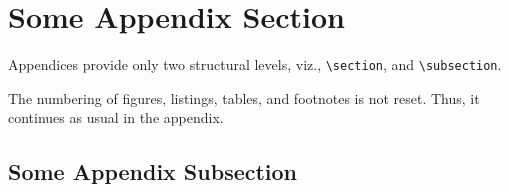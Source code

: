 \section{Some Appendix Section}
\label{sec:appendix01}
Appendices provide only two structural levels, viz., \texttt{\textbackslash section}, and \texttt{\textbackslash subsection}.

The numbering of figures, listings, tables, and footnotes is not reset. Thus, it continues as usual in the appendix.

\subsection{Some Appendix Subsection}

\lipsum[10]